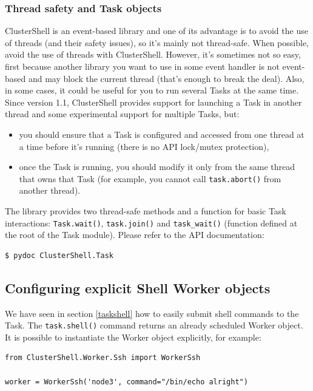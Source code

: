 \documentclass[english,a4paper]{csuserguide}
\begin{document}
\subsubsection{Thread safety and Task objects}

ClusterShell is an event-based library and one of its advantage is to avoid the use of threads (and their safety issues), so it's mainly not thread-safe. When possible, avoid the use of threads with ClusterShell. However, it's sometimes not so easy, first because another library you want to use in some event handler is not event-based and may block the current thread (that's enough to break the deal). Also, in some cases, it could be useful for you to run several Tasks at the same time. Since version 1.1, ClusterShell provides support for launching a Task in another thread and some experimental support for multiple Tasks, but:
\begin{itemize}
\item you should ensure that a Task is configured and accessed from one thread at a time before it's running (there is no API lock/mutex protection),
\item once the Task is running, you should modify it only from the same thread that owns that Task (for example, you cannot call \lstinline+task.abort()+ from another thread).
\end{itemize}
The library provides two thread-safe methods and a function for basic Task interactions: \lstinline+Task.wait()+, \lstinline+task.join()+ and \lstinline+task_wait()+ (function defined at the root of the Task module). Please refer to the API documentation:
\begin{verbatim}
$ pydoc ClusterShell.Task
\end{verbatim}

\subsection{Configuring explicit Shell Worker objects}

We have seen in section \ref{taskshell} how to easily submit shell commands to the Task. The \lstinline+task.shell()+ command returns an already scheduled Worker object. It is possible to instantiate the Worker object explicitly, for example:
\medskip
\begin{lstlisting}[breaklines=true, breakatwhitespace=true]
from ClusterShell.Worker.Ssh import WorkerSsh

worker = WorkerSsh('node3', command="/bin/echo alright")
\end{lstlisting}
\end{document}

